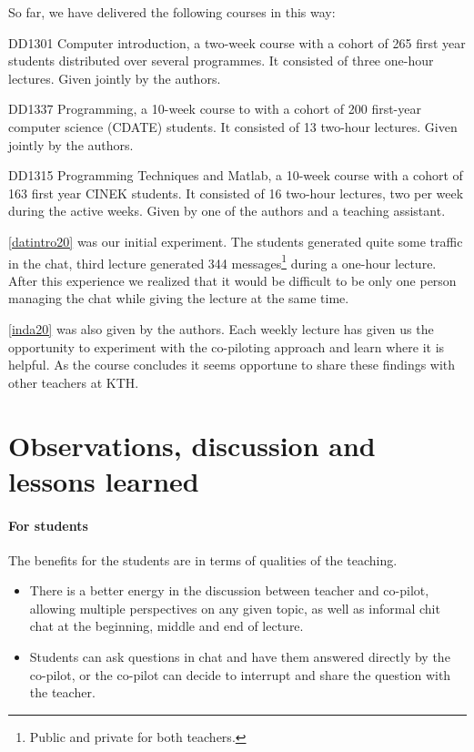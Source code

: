 \documentclass{article}
\begin{document}
So far, we have delivered the following courses in this way:
\begin{courses}
  \item\label{datintro20} DD1301 Computer introduction, a two-week course with 
    a cohort of 265 first year students distributed over several programmes.
    It consisted of three one-hour lectures.
    Given jointly by the authors.

  \item\label{inda20} DD1337 Programming, a 10-week course to with a cohort of 
    200 first-year computer science (CDATE) students.
    It consisted of 13 two-hour lectures.
    Given jointly by the authors.

  \item\label{prgi20} DD1315 Programming Techniques and Matlab, a 10-week 
    course with a cohort of 163 first year CINEK students.
    It consisted of 16 two-hour lectures, two per week during the active weeks.
    Given by one of the authors and a teaching assistant.
\end{courses}

\ref{datintro20} was our initial experiment.
The students generated quite some traffic in the chat, \eg third lecture generated
344
messages\footnote{%
  Public and private for both teachers.
} during a one-hour lecture.
After this experience we realized that it would be difficult to be only one 
person managing the chat while giving the lecture at the same time.

\ref{inda20} was also given by the authors.
Each weekly lecture has given us the opportunity to experiment with the 
co-piloting approach and learn where it is helpful.
As the course concludes it seems opportune to share these findings with other 
teachers at KTH.


\section*{Observations, discussion and lessons learned}

\paragraph{For students}

The benefits for the students are in terms of qualities of the teaching.

\begin{itemize}
  \item There is a better energy in the discussion between teacher and 
    co-pilot, allowing multiple perspectives on any given topic, as well as 
    informal chit chat at the beginning, middle and end of lecture.

  \item Students can ask questions in chat and have them answered directly by 
    the co-pilot, or the co-pilot can decide to interrupt and share the 
    question with the teacher.
\end{itemize}
\end{document}
